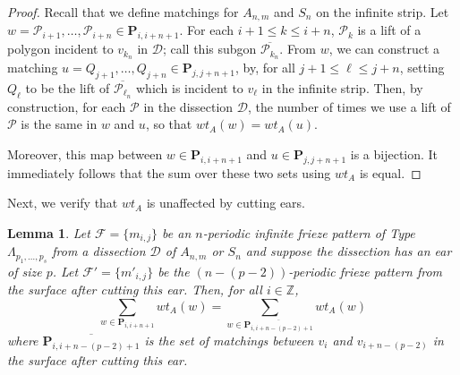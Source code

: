 \documentclass[12pt]{article}
\newtheorem{lemma}{Lemma}
\theoremstyle{remark}
\newcommand*{\pathset}[2]{\mathbf{P}_{#1,#2}}
\newcommand*{\poly}[1]{\mathcal{P}_{#1}}
\newcommand*{\F}{\mathcal{F}}
\newcommand*{\D}{\mathcal{D}}
\begin{document}
\begin{proof}
 Recall that we define matchings for $A_{n,m}$ and $S_n$ on the infinite strip. Let $w = \poly{i+1},\ldots,\poly{i+n} \in \pathset{i}{i+n+1}$. For each $i+1 \leq k \leq i+n$, $\poly{k}$ is a lift of a polygon incident to $v_{k_n}$ in $\D$; call this subgon  $\overline{\poly{k_n}}$.  From $w$, we can construct a matching $u = Q_{j+1},\ldots,Q_{j+n} \in \pathset{j}{j+n+1}$, by, for all $j+1 \leq \ell \leq j+n$, setting $Q_\ell$ to be the lift of $\overline{\poly{\ell_n}}$ which is incident to $v_\ell$ in the infinite strip.  Then, by construction, for each $\mathcal{P}$ in the dissection $\D$, the number of times we use a lift of $\mathcal{P}$ is the same in $w$ and $u$, so that $wt_A(w) = wt_A(u)$.
 
 Moreover, this map between $w \in \pathset{i}{i+n+1}$ and $u \in \pathset{j}{j+n+1}$ is a bijection. It immediately follows that the sum over these two sets using $wt_A$ is equal.
\end{proof}

Next, we verify that $wt_A$ is unaffected by cutting ears. 

\begin{lemma}\label{lem:wtAEars}
Let $\F = \{m_{i,j}\}$ be an $n$-periodic infinite frieze pattern of Type $\Lambda_{p_1,\ldots,p_s}$ from a dissection $\D$ of $A_{n,m}$ or $S_n$ and suppose the dissection has an ear of size $p$. Let $\F' = \{m'_{i,j}\}$ be the $(n-(p-2))$-periodic frieze pattern from the surface after cutting this ear. Then, for all $i \in \mathbb{Z}$,\[
\sum_{w \in \pathset{i}{i+n+1}} wt_A(w) = \sum_{w \in \overline{\pathset{i}{i + n - (p-2)+1}}} wt_A(w)
\]
where $ \overline{\pathset{i}{i + n - (p-2)+1}}$ is the set of matchings between $v_i$ and $v_{i+n-(p-2)}$ in the surface after cutting this ear.
\end{lemma}
\end{document}
